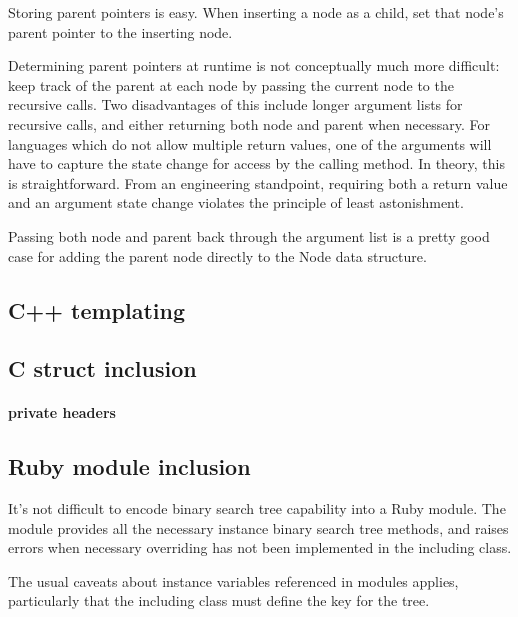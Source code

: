 Storing parent pointers is easy. When inserting a node as a child, set that
node's parent pointer to the inserting node.

Determining parent pointers at runtime is not conceptually much more difficult:
keep track of the parent at each node by passing the current node to the
recursive calls. Two disadvantages of this include longer argument lists
for recursive calls, and either returning both node and parent when necessary.
For languages which do not allow multiple return values, one of the arguments
will have to capture the state change for access by the calling method.
In theory, this is straightforward. From an engineering standpoint, requiring
both a return value and an argument state change violates the principle of
least astonishment.

Passing both node and parent back through the argument list is a pretty good
case for adding the parent node directly to the Node data structure.


\subsection{C++ templating}

\subsection{C struct inclusion}

\paragraph{private headers}

\subsection{Ruby module inclusion}

It's not difficult to encode binary search tree capability into a Ruby module.
The module provides all the necessary instance binary search tree methods, and
raises errors when necessary overriding has not been implemented in the
including class.

The usual caveats about instance variables referenced in modules applies,
particularly that the including class must define the key for the tree.
